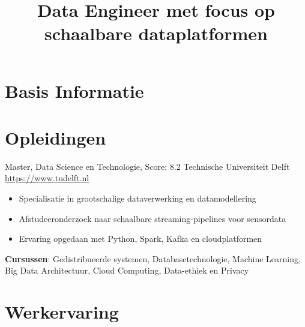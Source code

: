 \documentclass[a4paper, serif, 10pt]{moderncv}
\title{Data Engineer met focus op schaalbare dataplatformen}
\begin{document}
\maketitle

\section{Basis Informatie}

\section{Opleidingen}

        {Master, Data Science en Technologie, Score: 8.2}
        {Technische Universiteit Delft}
        {\url{https://www.tudelft.nl}}
        {}
        {\begin{itemize}
\item Specialisatie in grootschalige dataverwerking en datamodellering
\item Afstudeeronderzoek naar schaalbare streaming-pipelines voor sensordata
\item Ervaring opgedaan met Python, Spark, Kafka en cloudplatformen
\end{itemize}
\textbf{Cursussen}: Gedistribueerde systemen, Databasetechnologie, Machine Learning, Big Data Architectuur, Cloud Computing, Data-ethiek en Privacy}
\section{Werkervaring}
\end{document}
